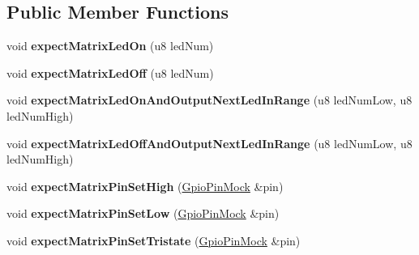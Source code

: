 \subsection*{Public Member Functions}
\begin{DoxyCompactItemize}
\item 
\mbox{\label{class_charlieplex_mapped_led_group_test_a990bed5744ed670f73e744ae748de98d}} 
void {\bfseries expect\+Matrix\+Led\+On} (u8 led\+Num)
\item 
\mbox{\label{class_charlieplex_mapped_led_group_test_a0c8fd09121b8be03514061456b22215e}} 
void {\bfseries expect\+Matrix\+Led\+Off} (u8 led\+Num)
\item 
\mbox{\label{class_charlieplex_mapped_led_group_test_a21287f89f59d8abcf3b76cfd3e4a1e30}} 
void {\bfseries expect\+Matrix\+Led\+On\+And\+Output\+Next\+Led\+In\+Range} (u8 led\+Num\+Low, u8 led\+Num\+High)
\item 
\mbox{\label{class_charlieplex_mapped_led_group_test_aee0c9669c2b5e9104f46c11f28aecc7b}} 
void {\bfseries expect\+Matrix\+Led\+Off\+And\+Output\+Next\+Led\+In\+Range} (u8 led\+Num\+Low, u8 led\+Num\+High)
\item 
\mbox{\label{class_charlieplex_mapped_led_group_test_a404081bb86aceeef5fd9398c1af063bf}} 
void {\bfseries expect\+Matrix\+Pin\+Set\+High} (\mbox{\hyperlink{class_gpio_pin_mock}{Gpio\+Pin\+Mock}} \&pin)
\item 
\mbox{\label{class_charlieplex_mapped_led_group_test_a5aa6af44591e31ab1b3dc5ac00453708}} 
void {\bfseries expect\+Matrix\+Pin\+Set\+Low} (\mbox{\hyperlink{class_gpio_pin_mock}{Gpio\+Pin\+Mock}} \&pin)
\item 
\mbox{\label{class_charlieplex_mapped_led_group_test_af51a44ded91de1a2b1e39bc1cccdb141}} 
void {\bfseries expect\+Matrix\+Pin\+Set\+Tristate} (\mbox{\hyperlink{class_gpio_pin_mock}{Gpio\+Pin\+Mock}} \&pin)
\end{DoxyCompactItemize}
